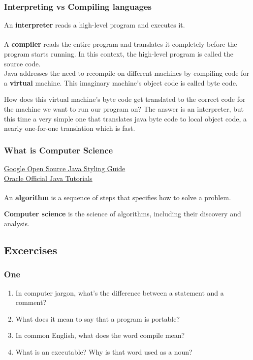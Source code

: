 \documentclass{article}
\begin{document}
\subsubsection{Interpreting vs Compiling languages}

An \textbf{interpreter} reads a high-level program and executes it.
\\
\\
A \textbf{compiler} reads the entire program and translates it completely before the program starts running. In this context, the high-level program is called the source code.
\\
Java addresses the need to recompile on different machines by compiling code for a \textbf{virtual} machine. This imaginary machine’s object code is called byte code.

How does this virtual machine’s byte code get translated to the correct code for the machine we want to run our program on? The answer is an interpreter, but this time a very simple one that translates java byte code to local object code, a nearly one-for-one translation which is fast.

\subsubsection{What is Computer Science}
\href{https://google.github.io/styleguide/javaguide.html}{Google Open Source Java Styling Guide}
\\
\href{https://docs.oracle.com/javase/tutorial/}{Oracle Official Java Tutorials}
\\
\\
An \textbf{algorithm} is a sequence of steps that specifies how to solve a problem. 

\textbf{Computer science} is the science of algorithms, including their discovery and analysis.

\subsection{Excercises}

\subsubsection{One}
\begin{enumerate}
\item In computer jargon, what’s the difference between a statement and a comment?
\item What does it mean to say that a program is portable?
\item In common English, what does the word compile mean?
\item What is an executable? Why is that word used as a noun?
\end{enumerate}
\end{document}
